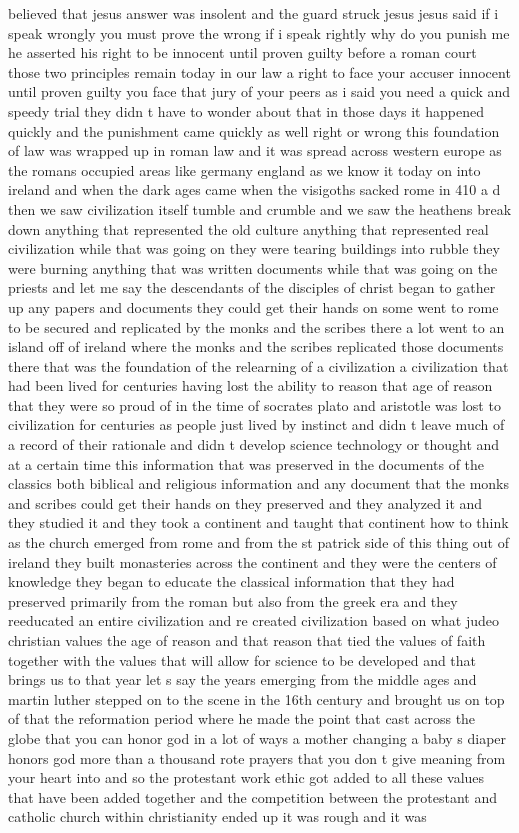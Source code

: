 \documentclass{article}
\begin{document}
believed that jesus answer was insolent and the guard struck jesus jesus said if i speak wrongly you must prove the wrong if i speak rightly why do you punish me he asserted his right to be innocent until proven guilty before a roman court those two principles remain today in our law a right to face your accuser innocent until proven guilty you face that jury of your peers as i said you need a quick and speedy trial they didn t have to wonder about that in those days it happened quickly and the punishment came quickly as well right or wrong this foundation of law was wrapped up in roman law and it was spread across western europe as the romans occupied areas like germany england as we know it today on into ireland and when the dark ages came when the visigoths sacked rome in 410 a d then we saw civilization itself tumble and crumble and we saw the heathens break down anything that represented the old culture anything that represented real civilization while that was going on they were tearing buildings into rubble they were burning anything that was written documents while that was going on the priests and let me say the descendants of the disciples of christ began to gather up any papers and documents they could get their hands on some went to rome to be secured and replicated by the monks and the scribes there a lot went to an island off of ireland where the monks and the scribes replicated those documents there that was the foundation of the relearning of a civilization a civilization that had been lived for centuries having lost the ability to reason that age of reason that they were so proud of in the time of socrates plato and aristotle was lost to civilization for centuries as people just lived by instinct and didn t leave much of a record of their rationale and didn t develop science technology or thought and at a certain time this information that was preserved in the documents of the classics both biblical and religious information and any document that the monks and scribes could get their hands on they preserved and they analyzed it and they studied it and they took a continent and taught that continent how to think as the church emerged from rome and from the st patrick side of this thing out of ireland they built monasteries across the continent and they were the centers of knowledge they began to educate the classical information that they had preserved primarily from the roman but also from the greek era and they reeducated an entire civilization and re created civilization based on what judeo christian values the age of reason and that reason that tied the values of faith together with the values that will allow for science to be developed and that brings us to that year let s say the years emerging from the middle ages and martin luther stepped on to the scene in the 16th century and brought us on top of that the reformation period where he made the point that cast across the globe that you can honor god in a lot of ways a mother changing a baby s diaper honors god more than a thousand rote prayers that you don t give meaning from your heart into and so the protestant work ethic got added to all these values that have been added together and the competition between the protestant and catholic church within christianity ended up it was rough and it was 
\end{document}
